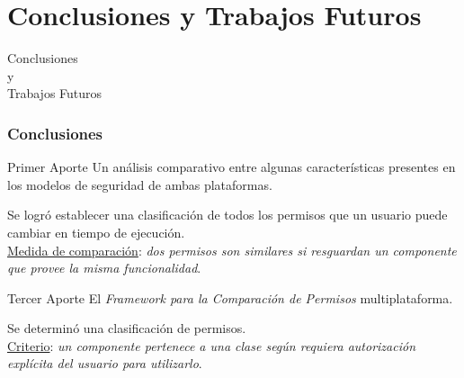 \section{Conclusiones y Trabajos Futuros}
\begin{frame}
 \begin{center}
  \LARGE Conclusiones\\ y\\ Trabajos Futuros
 \end{center}
\end{frame}
\begin{frame}
 \frametitle{Conclusiones}
 \begin{footnotesize}
 \begin{exampleblock}{Primer Aporte}
Un análisis comparativo entre algunas características presentes en los modelos de seguridad de ambas plataformas.
 \end{exampleblock}\pause
 \begin{exampleblock}{}
Se logró establecer una clasificación de todos los permisos que un usuario puede cambiar en tiempo de ejecución.\\ \pause \underline{Medida de comparación}: \emph{dos permisos son similares si resguardan un componente que provee la misma funcionalidad}.\\ 
 \end{exampleblock}\pause
 \begin{exampleblock}{Tercer Aporte}
El \emph{Framework para la Comparación de Permisos} multiplataforma.
 \end{exampleblock} \pause
 \begin{exampleblock}{}
Se determinó una clasificación de permisos.\\ \pause \underline{Criterio}: \emph{un componente pertenece a una clase según requiera autorización explícita del usuario para utilizarlo}.
 \end{exampleblock}
 \end{footnotesize}
\end{frame}

